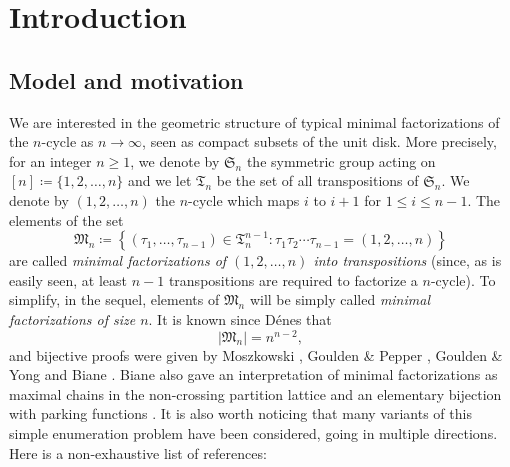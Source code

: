 \documentclass[10pt]{amsart}
\theoremstyle{definition}\newtheorem{defi}[theo]{Definition}\newtheorem{rema}[theo]{Remark}\newtheorem{exam}[theo]{Example}\newtheorem{exem}[theo]{Example}\newtheorem{nota}[theo]{Notation}
\begin{document}
\clearpage


\section{Introduction}

\subsection{Model and motivation}
We are interested in the geometric structure of  typical minimal factorizations of the $n$-cycle as $n \rightarrow \infty$, seen as compact subsets of the unit disk. More precisely,  for an integer $n \geq 1$, we denote by $ \mathfrak{S}_{n}$  the symmetric group acting on $[n] \coloneqq \{1,2, \ldots,n\}$ and we let $ \mathfrak{T}_{n}$ be the set of all transpositions of $ \mathfrak{S}_{n}$. We denote by $(1,2, \ldots,n)$ the $n$-cycle which maps $i$ to $i+1$ for $1 \leq i \leq n-1$. The elements of the set
\[ \mathfrak{M}_{n} \coloneqq  \left\{ (\tau_{1}, \ldots, \tau_{n-1}) \in \mathfrak{T}_{n}^{n-1} : \tau_{1} \tau_{2} \cdots \tau_{n-1}= (1,2, \ldots,n)  \right\}\]
are called \emph{minimal factorizations of  $(1,2, \ldots,n)$ into transpositions} (since, as is easily seen, at least $n-1$ transpositions are required to factorize a $n$-cycle). To simplify, in the sequel, elements of $ \mathfrak{M}_{n}$ will be simply called \emph{minimal factorizations of size $n$}.  It is known since D\'enes \cite{Den59} that
\begin{equation}
\label{eq:cardFn}  |\mathfrak{M}_{n}|  =n^{n-2},
\end{equation}
and bijective proofs were given by Moszkowski \cite{Mos89},
Goulden \& Pepper \cite{GP93}, Goulden \& Yong \cite{GY02} and Biane \cite{Biane2004}.
Biane also gave an interpretation of minimal factorizations
as maximal chains in the non-crossing partition lattice \cite{Biane1997}
and an elementary bijection with parking functions \cite{Biane2002}.
It is also worth noticing that many variants of this simple enumeration problem
have been considered, going in multiple directions.
Here is a non-exhaustive list of references:
\end{document}
